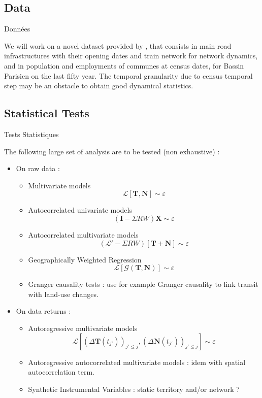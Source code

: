 \subsection{Data}{Données}

We will work on a novel dataset provided by , that consists in main road infrastructures with their opening dates and train network for network dynamics, and in population and employments of communes at census dates, for Bassin Parisien on the last fifty year. The temporal granularity due to census temporal step may be an obstacle to obtain good dynamical statistics. 


\subsection{Statistical Tests}{Tests Statistiques}


The following large set of analysis are to be tested (non exhaustive) :


\begin{itemize}
\item On raw data :
\begin{itemize}
\item Multivariate models
\[\mathcal{L}\left[\mathbf{T},\mathbf{N}\right]\sim \varepsilon\]
\item Autocorrelated univariate models
\[(\mathbf{I} - \Sigma R W) \mathbf{X} \sim \varepsilon\]
\item Autocorrelated multivariate models \[(\mathcal{L}' - \Sigma R W)\left[\mathbf{T}+\mathbf{N}\right] \sim \varepsilon\]
\item Geographically Weighted Regression~\cite{brunsdon1998geographically}
\[
\mathcal{L}\left[\mathcal{G}\left(\mathbf{T},\mathbf{N}\right)\right] \sim \varepsilon
\]
\item Granger causality tests : \cite{xie2009streetcars} use for example Granger causality to link transit with land-use changes.
\end{itemize}
\item On data returns :
\begin{itemize}
\item Autoregressive multivariate models
\[\mathcal{L}\left[(\Delta \mathbf{T}(t_{j'}))_{j'\leq j},(\Delta \mathbf{N}(t_{j'}))_{j'\leq j}\right] \sim \varepsilon\]
\item Autoregressive autocorrelated multivariate models : idem with spatial autocorrelation term.
\item Synthetic Instrumental Variables : static territory and/or network ?
\end{itemize}
\end{itemize}



